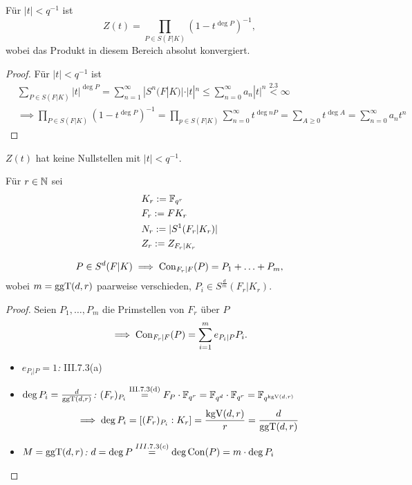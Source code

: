 \begin{satz}
    Für $|t| < q^{-1}$ ist
    $$ Z(t) = \prod_{P \in S(F|K)}(1-t^{\deg P})^{-1}, $$
    wobei das Produkt in diesem Bereich absolut konvergiert.
\end{satz}
\begin{proof}
    Für $|t| < q^{-1}$ ist 
    \begin{align*}
        &\sum_{P\in S(F|K)} |t|^{\deg P} = \sum_{n=1}^\infty |S^n(F|K)|\cdot|t|^n \leq \sum_{n=0}^\infty a_n |t|^n \stackrel{2.3}{<} \infty\\
        &\implies \prod_{P\in S(F|K)} (1-t^{\deg P})^{-1} = \prod_{p \in S(F|K)}\sum_{n=0}^\infty t^{\deg nP} = \sum_{A \geq 0} t^{\deg A}
        = \sum_{n=0}^\infty a_nt^n
    \end{align*}
\end{proof}

\begin{korollar}
    $Z(t)$ hat keine Nullstellen mit $|t| < q^{-1}$.
\end{korollar}

\begin{definition}
    Für $r \in \mathbb{N}$ sei
    \begin{align*}
        & K_r := \mathbb{F}_{q^r}\\
        & F_r := FK_r \\
        & N_r := |S^1(F_r|K_r)| \\
        & Z_r := Z_{F_r|K_r}
    \end{align*}
\end{definition}

\begin{lemma}
    $$ P\in S^d(F|K) \implies \operatorname{Con}_{F_r|F}(P)=P_1 + \ldots + P_m, $$
    wobei $m = \operatorname{ggT}(d,r)$ paarweise verschieden, $P_i \in S^{\frac{d}{m}}(F_r|K_r)$.
\end{lemma}
\begin{proof}
    Seien $P_1, \ldots, P_m$ die Primstellen von $F_r$ über $P$
    $$ \implies \operatorname{Con}_{F_r|F}(P) = \sum_{i=1}^m e_{P_i|P}P_i. $$
    \begin{itemize}
        \item \textit{$e_{P_i|P}=1$:} III.7.3(a)
        \item \textit{$\deg P_i = \frac{d}{\operatorname{ggT}(d,r)}$:} $(F_r)_{P_i} \stackrel{\text{III.7.3(d)}}{=} F_P\cdot\mathbb{F}_{q^r} = \mathbb{F}_{q^d}\cdot\mathbb{F}_{q^r} = \mathbb{F}_{q^{\operatorname{kgV}(d,r)}}$
        $$ \implies \deg P_i = [(F_r)_{P_i}:K_r] = \frac{\operatorname{kgV}(d,r)}{r} = \frac{d}{\operatorname{ggT}(d,r)}$$
        \item \textit{$M=\operatorname{ggT}(d,r)$:} $d = \deg P \stackrel{III.7.3(c)}{=} \deg \operatorname{Con}(P) = m \cdot \deg P_i$
    \end{itemize}
\end{proof}

